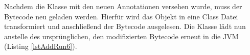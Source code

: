 \begin{figure}[!htb]
	
\end{figure}

Nachdem die Klasse mit den neuen Annotationen versehen wurde, muss der Bytecode neu geladen werden. Hierf\"ur  wird das  Objekt in eine Class Datei transformiert und anschlie\ss end der Bytecode ausgelesen. Die Klasse  l\"adt nun anstelle des urspr\"unglichen, den modifizierten Bytecode erneut in die JVM (Listing \ref{lstAddRun6}).

\begin{figure}[!htb]
	
\end{figure}

%






